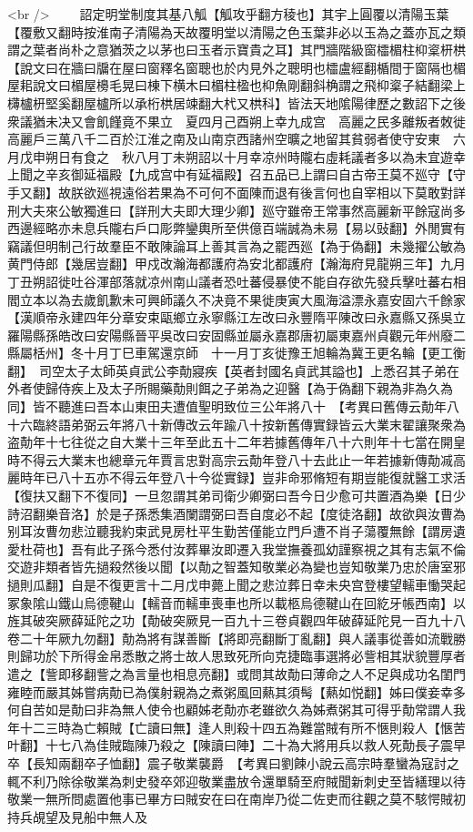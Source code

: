 <br />
　　詔定明堂制度其基八觚【觚攻乎翻方稜也】其宇上圓覆以清陽玉葉【覆敷又翻時按淮南子清陽為天故覆明堂以清陽之色玉葉非必以玉為之蓋亦瓦之類謂之葉者尚朴之意猶茨之以茅也曰玉者示寶貴之耳】其門牆階級窗櫺楣柱枊楶枅栱【說文曰在牆曰牖在屋曰窗釋名窗聰也於内見外之聰明也櫺盧經翻楯間于窗隔也楣屋耜說文曰楣屋櫋毛晃曰棟下横木曰楣柱楹也枊魚剛翻斜桷謂之飛枊楶子結翻梁上欂櫨枅堅奚翻屋櫨所以承桁栱居竦翻大杙又栱科】皆法天地隂陽律歷之數詔下之後衆議猶未决又會飢饉竟不果立　夏四月己酉朔上幸九成宫　高麗之民多離叛者敇徙高麗戶三萬八千二百於江淮之南及山南京西諸州空曠之地留其貧弱者使守安東　六月戊申朔日有食之　秋八月丁未朔詔以十月幸凉州時隴右虛耗議者多以為未宜遊幸上聞之辛亥御延福殿【九成宫中有延福殿】召五品已上謂曰自古帝王莫不廵守【守手又翻】故朕欲廵視遠俗若果為不可何不面陳而退有後言何也自宰相以下莫敢對詳刑大夫來公敏獨進曰【詳刑大夫即大理少卿】廵守雖帝王常事然高麗新平餘寇尚多西邊經略亦未息兵隴右戶口彫弊鑾輿所至供億百端誠為未易【易以䜴翻】外閒實有竊議但明制己行故羣臣不敢陳論耳上善其言為之罷西廵【為于偽翻】未幾擢公敏為黄門侍郎【幾居豈翻】甲戍改瀚海都護府為安北都護府【瀚海府見龍朔三年】九月丁丑朔詔徙吐谷渾部落就凉州南山議者恐吐蕃侵暴使不能自存欲先發兵擊吐蕃右相閻立本以為去歲飢歉未可興師議久不决竟不果徙庚寅大風海溢漂永嘉安固六千餘家【漢順帝永建四年分章安束甌鄉立永寧縣江左改曰永豐隋平陳改曰永嘉縣又孫吳立羅陽縣孫皓改曰安陽縣晉平吳改曰安固縣並屬永嘉郡唐初屬東嘉州貞觀元年州廢二縣屬栝州】冬十月丁巳車駕還京師　十一月丁亥徙豫王旭輪為冀王更名輪【更工衡翻】　司空太子太師英貞武公李勣寢疾【英者封國名貞武其謚也】上悉召其子弟在外者使歸侍疾上及太子所賜藥勣則餌之子弟為之迎醫【為于偽翻下親為非為久為同】皆不聽進曰吾本山東田夫遭值聖明致位三公年將八十　【考異曰舊傳云勣年八十六臨終語弟弼云年將八十新傳改云年踰八十按新舊傳實録皆云大業末翟讓聚衆為盗勣年十七往從之自大業十三年至此五十二年若據舊傳年八十六則年十七當在開皇時不得云大業末也總章元年賈言忠對高宗云勣年登八十去此止一年若據新傳勣㓕高麗時年已八十五亦不得云年登八十今從實録】豈非命邪脩短有期豈能復就醫工求活【復扶又翻下不復同】一旦忽謂其弟司衛少卿弼曰吾今日少愈可共置酒為樂【日少詩沼翻樂音洛】於是子孫悉集酒闌謂弼曰吾自度必不起【度徒洛翻】故欲與汝曹為别耳汝曹勿悲泣聽我約束武見房杜平生勤苦僅能立門戶遭不肖子蕩覆無餘【謂房遺愛杜荷也】吾有此子孫今悉付汝葬畢汝即遷入我堂撫養孤幼謹察視之其有志氣不倫交遊非類者皆先撾殺然後以聞【以勣之智蓋知敬業必為變也豈知敬業乃忠於唐室邪撾則瓜翻】自是不復更言十二月戊申薨上聞之悲泣葬日幸未央宫登樓望轜車慟哭起冢象隂山鐵山烏德鞬山【轜音而轜車喪車也所以載柩烏德鞬山在回紇牙帳西南】以旌其破突厥薛延陀之功【勣破突厥見一百九十三卷貞觀四年破薛延陀見一百九十八卷二十年厥九勿翻】勣為將有謀善斷【將即亮翻斷丁亂翻】與人議事從善如流戰勝則歸功於下所得金帛悉散之將士故人思致死所向克捷臨事選將必訾相其狀貌豐厚者遣之【訾即移翻訾之為言量也相息亮翻】或問其故勣曰薄命之人不足與成功名閨門雍睦而嚴其姊嘗病勣已為僕射親為之煮粥風回爇其須髩【爇如悦翻】姊曰僕妾幸多何自苦如是勣曰非為無人使令也顧姊老勣亦老雖欲久為姊煮粥其可得乎勣常謂人我年十二三時為亡賴賊【亡讀曰無】逢人則殺十四五為難當賊有所不愜則殺人【愜苦叶翻】十七八為佳賊臨陳乃殺之【陳讀曰陣】二十為大將用兵以救人死勣長子震早卒【長知兩翻卒子恤翻】震子敬業襲爵　【考異曰劉餗小說云高宗時羣蠻為寇討之輒不利乃除徐敬業為刺史發卒郊迎敬業盡放令還單騎至府賊聞新刺史至皆繕理以待敬業一無所問處置他事已畢方曰賊安在曰在南岸乃從二佐吏而往觀之莫不駭愕賊初持兵覘望及見船中無人及